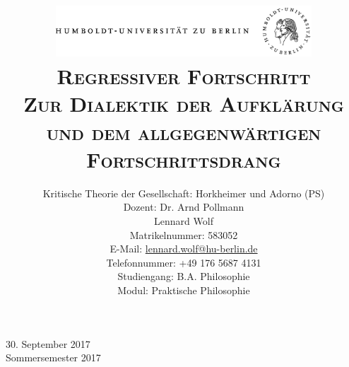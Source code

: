 \documentclass[a4paper, 12pt]{article}
\date{\vspace{-3ex}}
\begin{document}
\title{\vspace{5ex}
	\includegraphics*[bb=0 0 720 200, width=0.72\textwidth]{ErstesSem/images/hu_logo.png}\\
	\vspace{30pt}
	\scshape\LARGE{Regressiver Fortschritt}\\\vspace{5pt}\Large{Zur Dialektik der Aufklärung und dem allgegenwärtigen Fortschrittsdrang}\\\vspace{20pt}}
	


\author{Kritische Theorie der Gesellschaft: Horkheimer und Adorno (PS)\\
	\vspace{7pt}
          Dozent: Dr. Arnd Pollmann\\\vspace{4pt}Lennard Wolf\\
        \small{Matrikelnummer: 583052}\\
        \small{E-Mail: \href{mailto:lennard.wolf@hu-berlin.de}{lennard.wolf@hu-berlin.de}}\\
        \small{Telefonnummer: +49 176 5687 4131}\\
        \small{Studiengang: B.A. Philosophie}\\
        \small{Modul: Praktische Philosophie}}

\maketitle

\vspace{\fill}

\begin{minipage}[]{0.92\textwidth}
    \centering
    \onehalfspacing
    \large   
    30. September 2017\\
    Sommersemester 2017

    \vspace{-20mm} 
\end{minipage}%
\thispagestyle{empty}
\newpage
\setcounter{page}{1}
\end{document}
